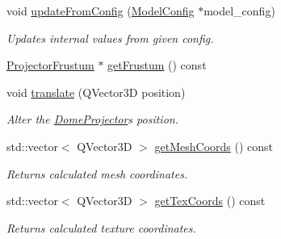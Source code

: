 \begin{DoxyCompactItemize}
void \mbox{\hyperlink{class_dome_projector_a70b4a39dec84fa11faf57a7dbd422c37}{update\+From\+Config}} (\mbox{\hyperlink{struct_model_config}{Model\+Config}} $\ast$model\+\_\+config)
\begin{DoxyCompactList}\small\item\em Updates internal values from given config. \end{DoxyCompactList}\item 
\mbox{\hyperlink{class_projector_frustum}{Projector\+Frustum}} $\ast$ \mbox{\hyperlink{class_dome_projector_a6d7a65d45ce490b25d79694ec2b76f3b}{get\+Frustum}} () const
\item 
void \mbox{\hyperlink{class_dome_projector_afd963b30b1cd4fa401de40ce99a5da7b}{translate}} (Q\+Vector3D position)
\begin{DoxyCompactList}\small\item\em Alter the \mbox{\hyperlink{class_dome_projector}{Dome\+Projector}}\textquotesingle{}s position. \end{DoxyCompactList}\item 
std\+::vector$<$ Q\+Vector3D $>$ \mbox{\hyperlink{class_dome_projector_a7289aa1fc872437e0ce0ced081f3ca87}{get\+Mesh\+Coords}} () const
\begin{DoxyCompactList}\small\item\em Returns calculated mesh coordinates. \end{DoxyCompactList}\item 
std\+::vector$<$ Q\+Vector3D $>$ \mbox{\hyperlink{class_dome_projector_abb4b7cda4a5e64e3069a1b5ace4a8ca2}{get\+Tex\+Coords}} () const
\begin{DoxyCompactList}\small\item\em Returns calculated texture coordinates. \end{DoxyCompactList}\end{DoxyCompactItemize}
